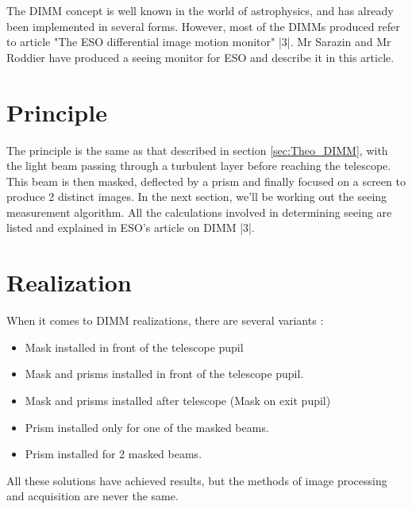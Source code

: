 The \Gls{DIMM} concept is well known in the world of astrophysics, and has already been implemented in several forms.
However, most of the \Gls{DIMM}s produced refer to article "The ESO differential image motion monitor" |3|.
Mr Sarazin and Mr Roddier have produced a seeing monitor for ESO and describe it in this article.

\section{Principle}
The principle is the same as that described in section \ref{sec:Theo_DIMM}, with the light beam passing through a turbulent layer
before reaching the telescope. This beam is then masked, deflected by a prism and finally focused on a screen to produce
2 distinct images. In the next section, we'll be working out the seeing measurement algorithm. All the calculations involved
in determining seeing are listed and explained in ESO's article on DIMM |3|.
\section{Realization}
When it comes to \Gls{DIMM} realizations, there are several variants :
\begin{itemize}
    \item Mask installed in front of the telescope pupil
    \item Mask and prisms installed in front of the telescope pupil.
    \item Mask and prisms installed after telescope (Mask on exit pupil)
    \item Prism installed only for one of the masked beams.
    \item Prism installed for 2 masked beams.
\end{itemize}
All these solutions have achieved results, but the methods of image processing and acquisition are never the same.
\newpage
